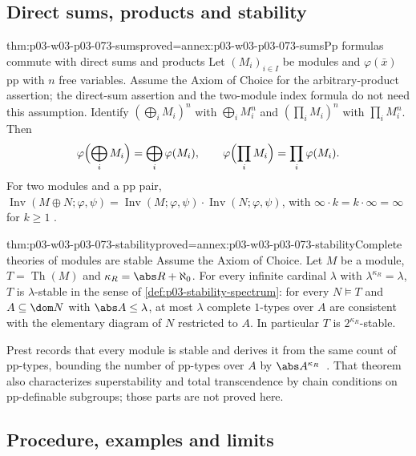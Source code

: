 \subsection{Direct sums, products and stability}
\label{sec:p03-w03-p03-073-sums}

\begin{hblemma}{thm:p03-w03-p03-073-sums}{proved=annex:p03-w03-p03-073-sums}{Pp formulas commute with direct sums and products}
Let \((M_i)_{i\in I}\) be modules and \(\varphi(\bar x)\) pp with \(n\)
free variables. Assume the Axiom of Choice for the arbitrary-product
assertion; the direct-sum assertion and the two-module index formula do not
need this assumption. Identify \((\bigoplus_iM_i)^n\) with
\(\bigoplus_i M_i^n\) and \((\prod_iM_i)^n\) with \(\prod_iM_i^n\). Then
\[
 \varphi\Bigl(\bigoplus_iM_i\Bigr)=\bigoplus_i\varphi(M_i),\qquad
 \varphi\Bigl(\prod_iM_i\Bigr)=\prod_i\varphi(M_i).
\]
For two modules and a pp pair,
\(\operatorname{Inv}(M\oplus N;\varphi,\psi)
=\operatorname{Inv}(M;\varphi,\psi)\cdot\operatorname{Inv}(N;\varphi,\psi)\),
with \(\infty\cdot k=k\cdot\infty=\infty\) for \(k\ge1\)
\cite[\S7]{Prest2020ModelTheoryModules}.
\end{hblemma}

\begin{hbtheorem}{thm:p03-w03-p03-073-stability}{proved=annex:p03-w03-p03-073-stability}{Complete theories of modules are stable}
Assume the Axiom of Choice. Let \(M\) be a module, \(T=\operatorname{Th}(M)\)
and \(\kappa_R=\abs R+\aleph_0\). For every infinite cardinal \(\lambda\)
with \(\lambda^{\kappa_R}=\lambda\), \(T\) is \(\lambda\)-stable in the
sense of \cref{def:p03-stability-spectrum}: for every \(N\models T\) and
\(A\subseteq\dom N\) with \(\abs A\le\lambda\), at most \(\lambda\)
complete \(1\)-types over \(A\) are consistent with the elementary diagram
of \(N\) restricted to \(A\). In particular \(T\) is
\(2^{\kappa_R}\)-stable.
\end{hbtheorem}

Prest records that every module is stable and derives it from the same
count of pp-types, bounding the number of pp-types over \(A\) by
\(\abs A^{\kappa_R}\)~\cite[\S6 and Theorem~6.1(i)]{Prest2020ModelTheoryModules}.
That theorem also characterizes superstability and total transcendence by
chain conditions on pp-definable subgroups; those parts are not proved here.

\subsection{Procedure, examples and limits}
\label{sec:p03-w03-p03-073-procedure}

